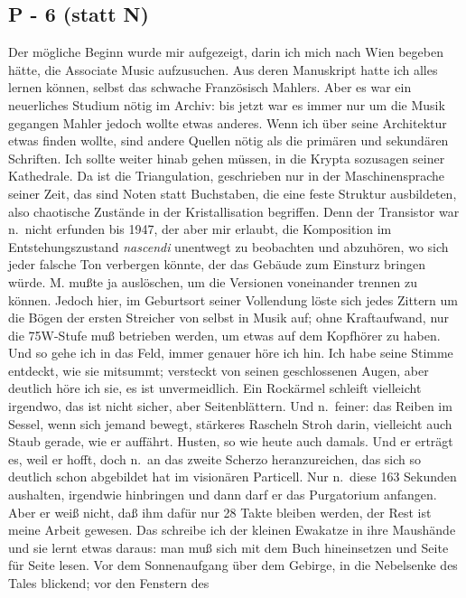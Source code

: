 \documentclass[
]{article}
\author{}
\date{\vspace{-2.5em}}
\begin{document}
\subsection{P - 6 (statt N)}\label{p---6-statt-n}

Der mögliche Beginn wurde mir aufgezeigt, darin ich mich nach Wien
begeben hätte, die Associate Music aufzusuchen. Aus deren Manuskript
hatte ich alles lernen können, selbst das schwache Französisch Mahlers.
Aber es war ein neuerliches Studium nötig im Archiv: bis jetzt war es
immer nur um die Musik gegangen Mahler jedoch wollte etwas anderes. Wenn
ich über seine Architektur etwas finden wollte, sind andere Quellen
nötig als die primären und sekundären Schriften. Ich sollte weiter hinab
gehen müssen, in die Krypta sozusagen seiner Kathedrale. Da ist die
Triangulation, geschrieben nur in der Maschinensprache seiner Zeit, das
sind Noten statt Buchstaben, die eine feste Struktur ausbildeten, also
chaotische Zustände in der Kristallisation begriffen. Denn der
Transistor war n.~nicht erfunden bis 1947, der aber mir erlaubt, die
Komposition im Entstehungszustand \emph{nascendi} unentwegt zu
beobachten und abzuhören, wo sich jeder falsche Ton verbergen könnte,
der das Gebäude zum Einsturz bringen würde. M. mußte ja auslöschen, um
die Versionen voneinander trennen zu können. Jedoch hier, im Geburtsort
seiner Vollendung löste sich jedes Zittern um die Bögen der ersten
Streicher von selbst in Musik auf; ohne Kraftaufwand, nur die 75W-Stufe
muß betrieben werden, um etwas auf dem Kopfhörer zu haben. Und so gehe
ich in das Feld, immer genauer höre ich hin. Ich habe seine Stimme
entdeckt, wie sie mitsummt; versteckt von seinen geschlossenen Augen,
aber deutlich höre ich sie, es ist unvermeidlich. Ein Rockärmel schleift
vielleicht irgendwo, das ist nicht sicher, aber Seitenblättern. Und
n.~feiner: das Reiben im Sessel, wenn sich jemand bewegt, stärkeres
Rascheln Stroh darin, vielleicht auch Staub gerade, wie er auffährt.
Husten, so wie heute auch damals. Und er erträgt es, weil er hofft, doch
n.~an das zweite Scherzo heranzureichen, das sich so deutlich schon
abgebildet hat im visionären Particell. Nur n.~diese 163 Sekunden
aushalten, irgendwie hinbringen und dann darf er das Purgatorium
anfangen. Aber er weiß nicht, daß ihm dafür nur 28 Takte bleiben werden,
der Rest ist meine Arbeit gewesen. Das schreibe ich der kleinen Ewakatze
in ihre Maushände und sie lernt etwas daraus: man muß sich mit dem Buch
hineinsetzen und Seite für Seite lesen. Vor dem Sonnenaufgang über dem
Gebirge, in die Nebelsenke des Tales blickend; vor den Fenstern des
\end{document}
